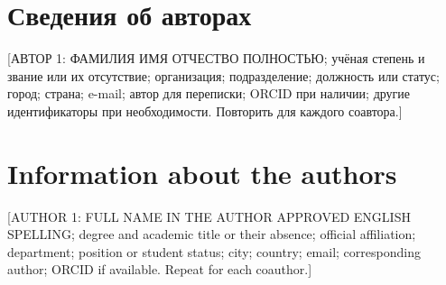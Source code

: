 \documentclass[10pt,a4paper]{article}
\begin{document}
\section*{Сведения об авторах}
[АВТОР 1: ФАМИЛИЯ ИМЯ ОТЧЕСТВО ПОЛНОСТЬЮ; учёная степень и звание или их отсутствие; организация; подразделение; должность или статус; город; страна; e-mail; автор для переписки; ORCID при наличии; другие идентификаторы при необходимости. Повторить для каждого соавтора.]

\section*{Information about the authors}
[AUTHOR 1: FULL NAME IN THE AUTHOR APPROVED ENGLISH SPELLING; degree and academic title or their absence; official affiliation; department; position or student status; city; country; email; corresponding author; ORCID if available. Repeat for each coauthor.]
\end{document}
